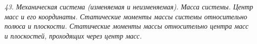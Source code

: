 \emph{43. Механическая система (изменяемая и неизменяемая). Масса системы. Центр
масс и его координаты. Статические моменты массы системы относительно
полюса и плоскости. Статические моменты массы относительно центра масс и
плоскостей, проходящих через центр масс.}

\newpage %
